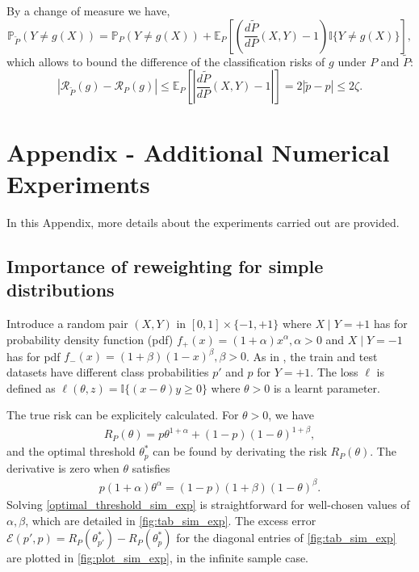 \documentclass[12pt]{article}
\newcommand{\I}[0]{\mathbb{I}}
\def\I{{\mathbb I}}
\begin{document}
By a change of measure we have,
$$
\mathbb{P}_{\widetilde{P}}(Y\neq g(X)) = \mathbb{P}_{P}(Y\neq g(X))
+ \mathbb{E}_P\left[\left(\frac{d\widetilde{P}}{dP}(X,Y) - 1\right)\mathbb{I}\{Y\neq g(X)\}\right],
$$
which allows to bound the difference of the classification risks of $g$ under $P$ and $\widetilde{P}$:
$$
\left|\mathcal{R}_{\widetilde{P}}(g) - \mathcal{R}_P(g)\right| \le \mathbb{E}_P\left[\left|\frac{d\widetilde{P}}{dP}(X,Y) - 1\right|\right]
= 2 |\widetilde{p}-p| \le 2\zeta.
$$
 
\section*{Appendix - Additional Numerical Experiments}

In this Appendix, more details about the experiments carried out are provided.

\subsection*{Importance of reweighting for simple distributions}

Introduce a random pair $(X,Y)$ in $[0,1] \times \{-1, +1\}$ where $X\mid Y=+1$
has for probability density function (pdf) $f_+(x) = ( 1 + \alpha ) x^\alpha, \alpha>0$ and
$X\mid Y=-1$ has for pdf $f_-(x) = ( 1 + \beta
)(1-x)^\beta, \beta>0$. As in , the train and test datasets have
different class probabilities $p'$ and $p$ for $Y=+1$.
The loss $\ell$ is defined as $\ell(\theta,z) = \I\{ (x-\theta)y \ge 0\}$ where
$\theta>0$ is a learnt parameter.

The true risk can be explicitely calculated. For $\theta>0$, we have
\begin{align*}
    R_P(\theta) = p \theta^{1 + \alpha} + (1-p) (1-\theta)^{1+\beta},
\end{align*}
and the optimal threshold $\theta^*_{p}$ can be found by derivating the risk
$R_P(\theta)$.  The derivative is zero when $\theta$ satisfies
\begin{align}
    p(1+\alpha) \theta^\alpha = (1-p)(1+\beta)(1-\theta)^\beta.
    \label{optimal_threshold_sim_exp}
\end{align}
Solving \cref{optimal_threshold_sim_exp} is straightforward for well-chosen values of 
$\alpha, \beta$, which are detailed in \cref{fig:tab_sim_exp}. The excess error 
$\mathcal{E}(p',p) = R_P(\theta^*_{p'}) - R_P(\theta^*_{p})$
for the diagonal entries of \cref{fig:tab_sim_exp} are plotted in
\cref{fig:plot_sim_exp}, in the infinite sample case.
\end{document}

